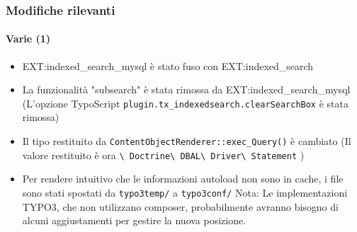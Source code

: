 
\begin{frame}[fragile]
	\frametitle{Modifiche rilevanti}
	\framesubtitle{Varie (1)}

	\begin{itemize}

		\item EXT:indexed\_search\_mysql è stato fuso con EXT:indexed\_search

		\item La funzionalità "subsearch" è stata rimossa da EXT:indexed\_search\_mysql\newline
			\smaller
				(L'opzione TypoScript \texttt{plugin.tx\_indexedsearch.clearSearchBox} è stata rimossa)
			\normalsize

		\item Il tipo restituito da \texttt{ContentObjectRenderer::exec\_Query()} è cambiato\newline
			\smaller
				(Il valore restituito è ora
					\texttt{\textbackslash
						Doctrine\textbackslash
						DBAL\textbackslash
						Driver\textbackslash
						Statement}
					)
			\normalsize

		\item Per rendere intuitivo che le informazioni autoload non sono in cache, i file
			sono stati spostati da \texttt{typo3temp/} a \texttt{typo3conf/}\newline
			\smaller
				Nota: Le implementazioni TYPO3, che non utilizzano composer, probabilmente
				avranno bisogno di alcuni aggiustamenti per gestire la nuova posizione.
			\normalsize

	\end{itemize}

\end{frame}

